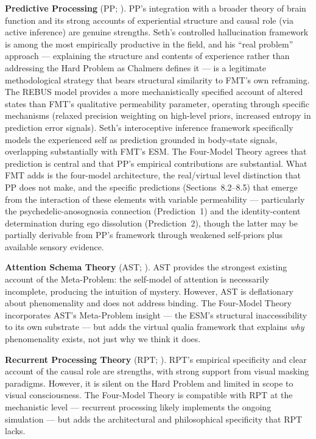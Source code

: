 \documentclass[12pt]{article}
\newcommand{\revstart}{}
\newcommand{\revend}{}
\begin{document}
{\revstart\textbf{Predictive Processing} (PP; \citealp{Friston2010,Seth2021}). PP's integration with a broader theory of brain function and its strong accounts of experiential structure and causal role (via active inference) are genuine strengths. Seth's controlled hallucination framework is among the most empirically productive in the field, and his ``real problem'' approach --- explaining the structure and contents of experience rather than addressing the Hard Problem as Chalmers defines it --- is a legitimate methodological strategy that bears structural similarity to FMT's own reframing. The REBUS model \citep{CarhartHarris2019} provides a more mechanistically specified account of altered states than FMT's qualitative permeability parameter, operating through specific mechanisms (relaxed precision weighting on high-level priors, increased entropy in prediction error signals). Seth's interoceptive inference framework \citep{Seth2021,SethBayne2022} specifically models the experienced self as prediction grounded in body-state signals, overlapping substantially with FMT's ESM. The Four-Model Theory agrees that prediction is central and that PP's empirical contributions are substantial. What FMT adds is the four-model architecture, the real/virtual level distinction that PP does not make, and the specific predictions (Sections~8.2--8.5) that emerge from the interaction of these elements with variable permeability --- particularly the psychedelic-anosognosia connection (Prediction~1) and the identity-content determination during ego dissolution (Prediction~2), though the latter may be partially derivable from PP's framework through weakened self-priors plus available sensory evidence.\revend}

\textbf{Attention Schema Theory} (AST; \citealp{Graziano2013}). AST provides the strongest existing account of the Meta-Problem: the self-model of attention is necessarily incomplete, producing the intuition of mystery. However, AST is deflationary about phenomenality and does not address binding. The Four-Model Theory incorporates AST's Meta-Problem insight --- the ESM's structural inaccessibility to its own substrate --- but adds the virtual qualia framework that explains \emph{why} phenomenality exists, not just why we think it does.

\textbf{Recurrent Processing Theory} (RPT; \citealp{Lamme2006,Lamme2010}). RPT's empirical specificity and clear account of the causal role are strengths, with strong support from visual masking paradigms. However, it is silent on the Hard Problem and limited in scope to visual consciousness. The Four-Model Theory is compatible with RPT at the mechanistic level --- recurrent processing likely implements the ongoing simulation --- but adds the architectural and philosophical specificity that RPT lacks.
\end{document}

